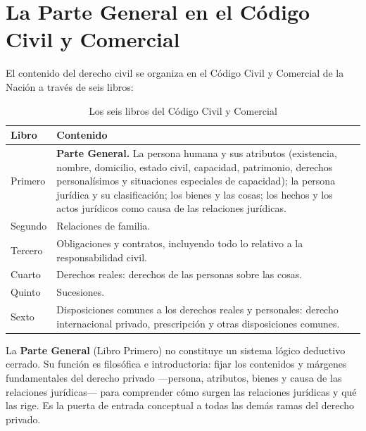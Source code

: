 \documentclass[12pt,oneside]{book}
\begin{document}
\section{La Parte General en el Código Civil y Comercial}
\label{sec:parte-general}

El contenido del derecho civil se organiza en el Código Civil y Comercial de la Nación a través de seis libros:

\begin{table}[H]
\centering
\begin{tabularx}{\textwidth}{B{0.17\textwidth} Y}
\toprule
\textbf{Libro} & \textbf{Contenido} \\
\midrule
Primero & \textbf{Parte General.} La persona humana y sus atributos (existencia, nombre, domicilio, estado civil, capacidad, patrimonio, derechos personalísimos y situaciones especiales de capacidad); la persona jurídica y su clasificación; los bienes y las cosas; los hechos y los actos jurídicos como causa de las relaciones jurídicas. \\
Segundo & Relaciones de familia. \\
Tercero & Obligaciones y contratos, incluyendo todo lo relativo a la responsabilidad civil. \\
Cuarto & Derechos reales: derechos de las personas sobre las cosas. \\
Quinto & Sucesiones. \\
Sexto & Disposiciones comunes a los derechos reales y personales: derecho internacional privado, prescripción y otras disposiciones comunes. \\
\bottomrule
\end{tabularx}
\caption{Los seis libros del Código Civil y Comercial}
\end{table}

\begin{importante}
La \textbf{Parte General} (Libro Primero) no constituye un sistema lógico deductivo cerrado. Su función es filosófica e introductoria: fijar los contenidos y márgenes fundamentales del derecho privado ---persona, atributos, bienes y causa de las relaciones jurídicas--- para comprender cómo surgen las relaciones jurídicas y qué las rige. Es la puerta de entrada conceptual a todas las demás ramas del derecho privado.
\end{importante}
\end{document}

